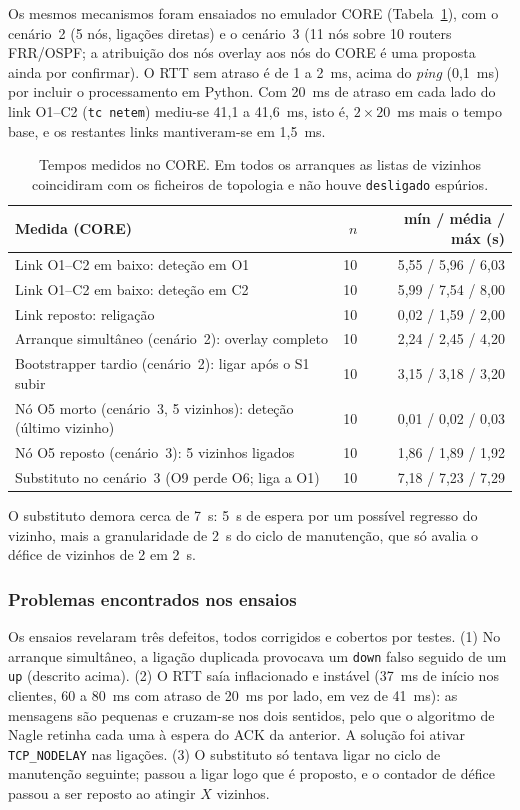 Os mesmos mecanismos foram ensaiados no emulador CORE (Tabela~\ref{tab:e1-core}), com o cenário~2
(5 nós, ligações diretas) e o cenário~3 (11 nós sobre 10 routers FRR/OSPF; a atribuição dos nós
overlay aos nós do CORE é uma proposta ainda por confirmar). O RTT sem atraso é de 1 a 2~ms, acima do
\emph{ping} (0,1~ms) por incluir o processamento em Python. Com 20~ms de atraso em cada lado do link
O1--C2 (\texttt{tc netem}) mediu-se 41,1 a 41,6~ms, isto é, $2\times 20$~ms mais o tempo base, e os
restantes links mantiveram-se em 1,5~ms.

\begin{table}[h]
\centering
\small
\begin{tabular}{lrr}
\hline
Medida (CORE) & $n$ & mín / média / máx (s) \\
\hline
Link O1--C2 em baixo: deteção em O1 & 10 & 5,55 / 5,96 / 6,03 \\
Link O1--C2 em baixo: deteção em C2 & 10 & 5,99 / 7,54 / 8,00 \\
Link reposto: religação & 10 & 0,02 / 1,59 / 2,00 \\
Arranque simultâneo (cenário~2): overlay completo & 10 & 2,24 / 2,45 / 4,20 \\
Bootstrapper tardio (cenário~2): ligar após o S1 subir & 10 & 3,15 / 3,18 / 3,20 \\
Nó O5 morto (cenário~3, 5 vizinhos): deteção (último vizinho) & 10 & 0,01 / 0,02 / 0,03 \\
Nó O5 reposto (cenário~3): 5 vizinhos ligados & 10 & 1,86 / 1,89 / 1,92 \\
Substituto no cenário~3 (O9 perde O6; liga a O1) & 10 & 7,18 / 7,23 / 7,29 \\
\hline
\end{tabular}
\caption{Tempos medidos no CORE. Em todos os arranques as listas de vizinhos coincidiram com os
ficheiros de topologia e não houve \texttt{desligado} espúrios.}
\label{tab:e1-core}
\end{table}

O substituto demora cerca de 7~s: 5~s de espera por um possível regresso do vizinho, mais a
granularidade de 2~s do ciclo de manutenção, que só avalia o défice de vizinhos de 2 em 2~s.

\subsubsection{Problemas encontrados nos ensaios}

Os ensaios revelaram três defeitos, todos corrigidos e cobertos por testes. (1) No arranque
simultâneo, a ligação duplicada provocava um \texttt{down} falso seguido de um \texttt{up}
(descrito acima). (2) O RTT saía inflacionado e instável (37~ms de início nos clientes, 60 a 80~ms com
atraso de 20~ms por lado, em vez de 41~ms): as mensagens são pequenas e cruzam-se nos dois sentidos,
pelo que o algoritmo de Nagle retinha cada uma à espera do ACK da anterior. A solução foi ativar
\texttt{TCP\_NODELAY} nas ligações. (3) O substituto só tentava ligar no ciclo de manutenção seguinte;
passou a ligar logo que é proposto, e o contador de défice passou a ser reposto ao atingir $X$
vizinhos.


